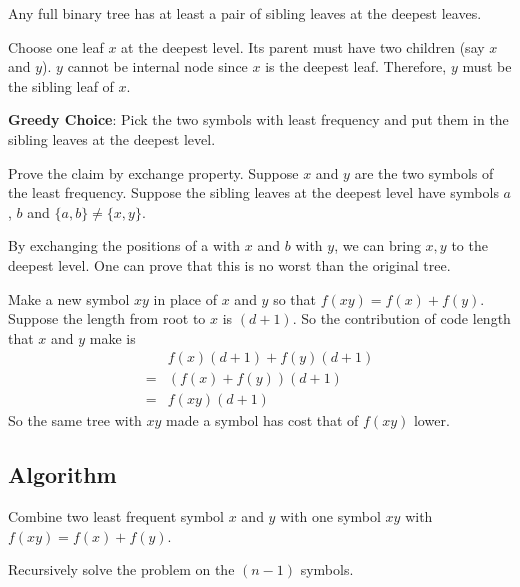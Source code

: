 \begin{claim}
	Any full binary tree has at least a pair of sibling leaves at the deepest leaves.
\end{claim}

\begin{claimproof}
	Choose one leaf $x$ at the deepest level. Its parent must have two children (say $x$ and $y$). $y$ cannot be internal node since $x$ is the deepest leaf. Therefore, $y$ must be the sibling leaf of $x$.
\end{claimproof}

\begin{claim}
	\textbf{Greedy Choice}: Pick the two symbols with least frequency and put them in the sibling leaves at the deepest level.
\end{claim}

\begin{claimproof}
	Prove the claim by exchange property. Suppose $x$ and $y$ are the two symbols of the least frequency. Suppose the sibling leaves at the deepest level have symbols $a$, $b$ and $\{a, b\} \neq \{x, y\}$.
	
	By exchanging the positions of a with $ x $ and $ b $ with $ y $, we can bring $ x, y $ to the deepest level. One can prove that this is no worst than the original tree.
	
\end{claimproof}

Make a new symbol $ xy $ in place of $ x $ and $ y $ so that $ f(xy) = f(x) + f(y) $. Suppose the length from root to $x$ is $ (d + 1) $. So the contribution of code length that $x$ and $y$ make is
\begin{align*}
& f(x) (d+1) + f(y)(d+1)\\
=& (f(x) + f(y))(d+1)\\
=& f(xy)(d+1)
\end{align*}
So the same tree with $xy$ made a symbol has cost that of $ f(xy) $ lower.

\subsection{Algorithm}
Combine two least frequent symbol $ x $ and $ y $ with one symbol $ xy $ with $ f(xy) = f(x) + f(y) $. 

Recursively solve the problem on the $ (n-1) $ symbols.